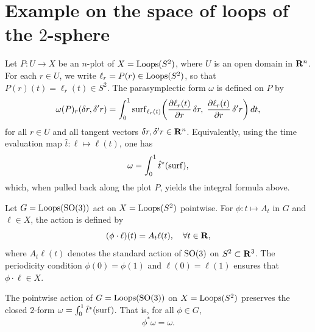 \documentclass[11pt,reqno,letterpaper,twoside]{amsart}
\begin{document}
  \section{Example on the space of loops of the $2$-sphere}
  
  Let $P : U \to X$ be an $n$-plot of $X = \operatorname{Loops}(S^{2})$, where $U$ is an open domain in ${\mathbf{R}}^{n}$. For each $r \in U$, we write $\ell_{r} = P(r) \in \operatorname{Loops}(S^{2})$, so that $P(r)(t) = \ell_{r}(t) \in S^{2}$. The parasymplectic form $\omega$ is defined on $P$ by
  \[
    \omega(P)_{r}(\delta r, \delta' r)
    = \int_{0}^{1} \operatorname{surf}_{\ell_{r}(t)}\!\left(
    \frac{\partial \ell_{r}(t)}{\partial r}\,\delta r,\;
    \frac{\partial \ell_{r}(t)}{\partial r}\,\delta' r
    \right) dt,
    \]
  for all $r \in U$ and all tangent vectors $\delta r, \delta' r \in {\mathbf{R}}^{n}$. Equivalently, using the time evaluation map $\hat{t} : \ell \mapsto \ell(t)$, one has
  \[
    \omega = \int_{0}^{1} \hat{t}^{*}(\operatorname{surf}),
    \]
  which, when pulled back along the plot $P$, yields the integral formula above.
  
  Let $G = \operatorname{Loops}(\mathrm{SO}(3))$ act on $X = \operatorname{Loops}(S^{2})$ pointwise.
  For $\phi: t \mapsto A_t$ in $G$ and $\ell \in X$, the action is defined by
  \[
    (\phi \cdot \ell)(t) = A_t \ell(t), \quad \forall t \in {\mathbf{R}},
    \]
  where $A_t \ell(t)$ denotes the standard action of $\mathrm{SO}(3)$ on $S^{2} \subset {\mathbf{R}}^{3}$.
  The periodicity condition $\phi(0) = \phi(1)$ and $\ell(0) = \ell(1)$ ensures that $\phi \cdot \ell \in X$.
  
  \begin{proposition}{}
    The pointwise action of $G = \operatorname{Loops}(\mathrm{SO}(3))$ on $X = \operatorname{Loops}(S^{2})$ preserves the closed $2$-form
    $\omega = \int_{0}^{1} \hat{t}^{*}(\operatorname{surf})$.
    That is, for all $\phi \in G$,
    \[
      \phi^{*}\omega = \omega.
      \]
  \end{proposition}
  
\end{document}
